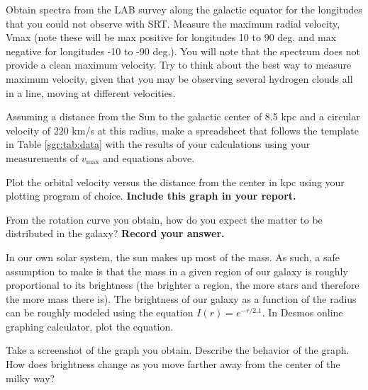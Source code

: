\begin{steps}
	\item Obtain spectra from the LAB survey along the galactic equator for the
	longitudes that you could not observe with SRT. Measure the
	maximum radial velocity, Vmax (note these will be max positive for
	longitudes 10 to 90 deg. and max negative for longitudes -10 to -90
	deg.). You will note that the spectrum does not provide a clean
	maximum velocity. Try to think about the best way to measure
	maximum velocity, given that you may be observing several hydrogen clouds all in a line, moving at different velocities.
	
	
	\item Assuming a distance from the Sun to the galactic center of 8.5 kpc and
	a circular velocity of 220 km/s at this radius, make a spreadsheet that follows the template in Table \ref{sgr:tab:data} with the
	results of your calculations using your measurements of $v_\textrm{max}$ and
	equations above.
	
	\item Plot the orbital velocity versus the distance from the center in kpc using your plotting program of choice. \textbf{Include this graph in your report.}
	
	\item From the rotation curve you obtain, how do you expect the matter to be distributed in the galaxy? \textbf{Record your answer.}
	
	\item In our own solar system, the sun makes up most of the mass. As such, a safe assumption to make is that the mass in a given region of our galaxy is roughly proportional to its brightness (the brighter a region, the more stars and therefore the more mass there is). The brightness of our galaxy as a function of the radius can be roughly modeled using the equation $I(r) = e^{-r/2.1}$. In Desmos online graphing calculator, plot the equation. 
	
	\item Take a screenshot of the graph you obtain. Describe the behavior of the graph. How does brightness change as you move farther away from the center of the milky way?
	

\end{steps}
